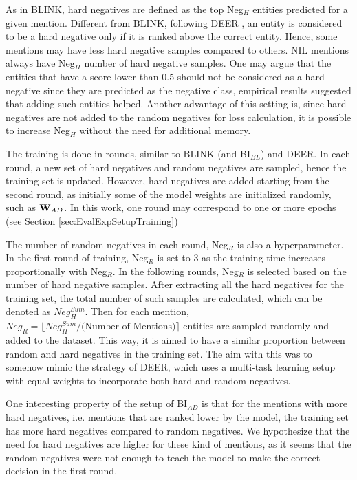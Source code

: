 \documentclass{report}
\theoremstyle{definition}
\theoremstyle{remark}
\begin{document}
As in BLINK, hard negatives are defined as the top Neg$_{H}$ entities predicted for a given mention. Different from BLINK, following DEER \cite{googleintern}, an entity is considered to be a hard negative only if it is ranked above the correct entity. Hence, some mentions may have less hard negative samples compared to others. NIL mentions always have Neg$_{H}$ number of hard negative samples. One may argue that the entities that have a score lower than 0.5 should not be considered as a hard negative since they are predicted as the negative class, empirical results suggested that adding such entities helped. Another advantage of this setting is, since hard negatives are not added to the random negatives for loss calculation, it is possible to increase Neg$_{H}$ without the need for additional memory.

The training is done in rounds, similar to BLINK (and BI$_{BL}$) and DEER. In each round, a new set of hard negatives and random negatives are sampled, hence the training set is updated. However, hard negatives are added starting from the second round, as initially some of the model weights are initialized randomly, such as $\bold{W}_{AD}$. In this work, one round may correspond to one or more epochs (see Section \ref{sec:EvalExpSetupTraining})

The number of random negatives in each round, Neg$_R$ is also a hyperparameter. In the first round of training, Neg$_R$ is set to 3 as the training time increases proportionally with Neg$_R$. In the following rounds, Neg$_R$ is selected based on the number of hard negative samples. After extracting all the hard negatives for the training set, the total number of such samples are calculated, which can be denoted as $Neg_{H}^{Sum}$. Then for each mention, $Neg_R = \lfloor Neg_{H}^{Sum}/ \text{(Number of Mentions)} \rceil$ entities are sampled randomly and added to the dataset. This way, it is aimed to have a similar proportion between random and hard negatives in the training set. The aim with this was to somehow mimic the strategy of DEER, which uses a multi-task learning setup with equal weights to incorporate both hard and random negatives. 

One interesting property of the setup of BI$_{AD}$ is that for the mentions with more hard negatives, i.e. mentions that are ranked lower by the model, the training set has more hard negatives compared to random negatives. We hypothesize that the need for hard negatives are higher for these kind of mentions, as it seems that the random negatives were not enough to teach the model to make the correct decision in the first round.
\end{document}
